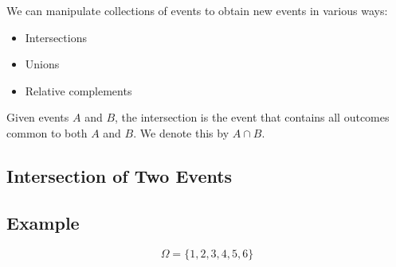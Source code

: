 \documentclass{article}
\begin{document}
\begin{center}
\end{center}

\pagebreak

We can manipulate collections of events to obtain new events in various ways:

\begin{itemize}
    \item Intersections
    \item Unions
    \item Relative complements
\end{itemize}

Given events \(A\) and \(B\), the intersection is the event that contains all outcomes common to both \(A\) and \(B\). We denote this by \(A \cap B\).

\subsection*{Intersection of Two Events}

\begin{center}
\end{center}

\subsection*{Example}

\[
\Omega = \{1, 2, 3, 4, 5, 6\}
\]
\end{document}
